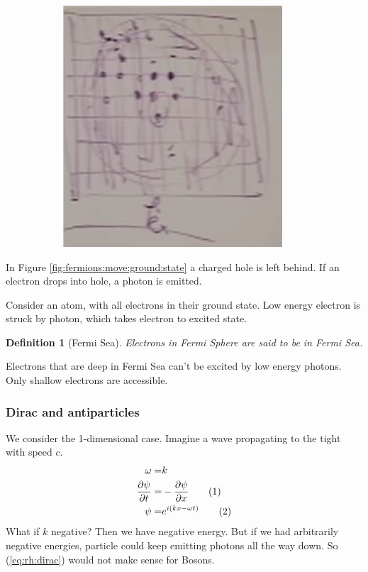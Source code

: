 \documentclass[]{article}
\newcommand\numberthis{\addtocounter{equation}{1}\tag{\theequation}}
\newtheorem{defn}[thm]{Definition}
\begin{document}
\begin{figure}[H]
\begin{subfigure}{0.5\textwidth}
		\includegraphics[width=0.9\textwidth]{moving-outside-fermi}
	\end{subfigure}
\end{figure}

In Figure \ref{fig:fermions:move:ground:state} a charged hole is left behind.
If an electron drops into hole, a photon is emitted.

Consider an atom, with all electrons in their ground state. Low energy electron is struck by photon, which takes electron to excited state.

\begin{defn}[Fermi Sea]
	Electrons in Fermi Sphere are said to be in Fermi Sea.
\end{defn}

Electrons that are deep in Fermi Sea can't be excited by low energy photons. Only shallow electrons are accessible.

\subsubsection{Dirac and antiparticles}

We consider the 1-dimensional case. Imagine a wave propagating to the tight with speed $c$.
\begin{align*}
\omega =& k\\
\frac{\partial \psi}{\partial t} =& - \frac{\partial \psi}{\partial x}  \numberthis \label{eq:rh:dirac}\\
\psi =& e^{i(kx-\omega t)} \numberthis \label{eq:rh:dirac:wave}
\end{align*}
What if $k$ negative? Then we have negative energy. But if we had arbitrarily negative energies, particle could keep emitting photons all the way down. So (\ref{eq:rh:dirac}) would not make sense for Bosons.
\end{document}
